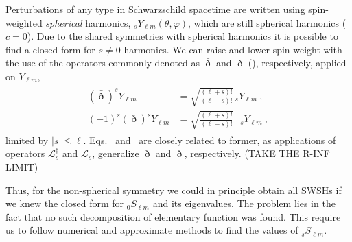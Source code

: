Perturbations of any type in Schwarzschild spacetime are written using spin-weighted \emph{spherical} harmonics, ${}_{s}Y_{\ell m}(\theta,\varphi)$, which are still spherical harmonics ($c=0$).
Due to the shared symmetries with spherical harmonics it is possible to find a closed form for $s\ne0$ harmonics.
We can raise and lower spin-weight with the use of the operators commonly denoted as $\bar{\eth}$ and $\eth$ (), respectively, applied on $Y_{\ell m}$,
\begin{align}
    \begin{split}
        (\bar{\eth})^s Y_{\ell m} &= \sqrt{\frac{(\ell+s)!}{(\ell-s)!}} \,{}_{s}Y_{\ell m}  ~, \\
        (-1)^s  (\eth)^s Y_{\ell m} &= \sqrt{\frac{(\ell+s)!}{(\ell-s)!}} \,{}_{-s}Y_{\ell m} ~,
    \end{split}
\end{align}
limited by $|s|\le\ell$.
Eqs.~ and~ are closely related to former, as applications of operators $\mathscr{L}^\dagger_s$ and $\mathscr{L}_s$, generalize $\bar{\eth}$ and $\eth$, respectively.
(TAKE THE R-INF LIMIT)

Thus, for the non-spherical symmetry we could in principle obtain all SWSHs if we knew the closed form for ${}_{0}S_{\ell m}$ and its eigenvalues. The problem lies in the fact that no such decomposition of elementary function was found. This require us to follow numerical and approximate methods to find the values of ${}_{s}S_{\ell m}$.

